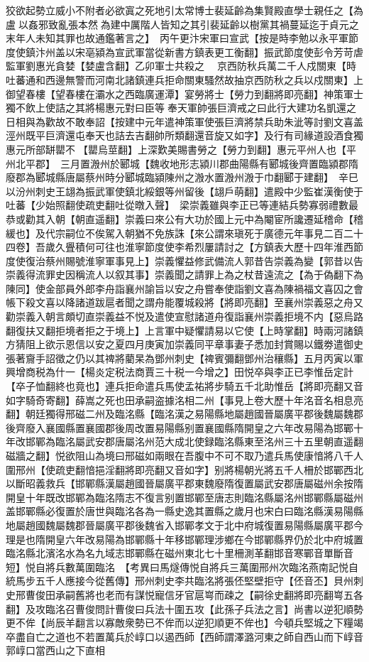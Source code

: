 狡欲起勢立威小不附者必欲寘之死地引太常博士裴延齡為集賢殿直學士親任之【為盧以姦邪致亂張本然為建中厲階人皆知之其引裴延齡以樹黨其禍蔓延迄于貞元之末年人未知其罪也故通鑑著言之】　丙午更汴宋軍曰宣武【按是時李勉以永平軍節度使鎮汴州盖以宋亳潁為宣武軍當從新書方鎮表更工衡翻】振武節度使彭令芳苛虐監軍劉惠光貪婪【婪盧含翻】乙卯軍士共殺之　京西防秋兵萬二千人戍關東【時吐蕃通和西邊無警而河南北諸鎮連兵拒命關東騷然故抽京西防秋之兵以戍關東】上御望春樓【望春樓在灞水之西臨廣運潭】宴勞將士【勞力到翻將即亮翻】神策軍士獨不飲上使詰之其將楊惠元對曰臣等奉天軍帥張巨濟戒之曰此行大建功名凱還之日相與為歡故不敢奉詔【按建中元年遣神策軍使張巨濟將禁兵助朱泚等討劉文喜盖涇州既平巨濟還屯奉天也詰去吉翻帥所類翻還音旋又如字】及行有司緣道設酒食獨惠元所部缾罌不【罌烏莖翻】上深歎美賜書勞之【勞力到翻】惠元平州人也【平州北平郡】　三月置溵州於郾城【魏收地形志潁川郡曲陽縣有郾城後齊置臨潁郡隋廢郡為郾城縣唐屬蔡州時分郾城臨潁陳州之溵水置溵州溵于巾翻郾于建翻】　辛巳以汾州刺史王翃為振武軍使鎮北綏銀等州留後【翃戶萌翻】遣殿中少監崔漢衡使于吐蕃【少始照翻使疏吏翻吐從暾入聲】　梁崇義雖與李正已等連結兵勢寡弱禮數最恭或勸其入朝【朝直遥翻】崇義曰來公有大功於國上元中為閹宦所讒遷延稽命【稽緩也】及代宗嗣位不俟駕入朝猶不免族誅【來公謂來瑱死于廣德元年事見二百二十四卷】吾歲久舋積何可往也淮寧節度使李希烈屢請討之【方鎮表大歷十四年淮西節度使復治蔡州賜號淮寧軍事見上】崇義懼益修武備流人郭昔告崇義為變【郭昔以告崇義得流罪史因稱流人以叙其事】崇義聞之請罪上為之杖昔遠流之【為于偽翻下為陳同】使金部員外郎李舟詣襄州諭旨以安之舟嘗奉使詣劉文喜為陳禍福文喜囚之會帳下殺文喜以降諸道跋扈者聞之謂舟能覆城殺將【將即亮翻】至襄州崇義惡之舟又勸崇義入朝言頗切直崇義益不悦及遣使宣慰諸道舟復詣襄州崇義拒境不内【惡烏路翻復扶又翻拒境者拒之于境上】上言軍中疑懼請易以它使【上時掌翻】時兩河諸鎮方猜阻上欲示恩信以安之夏四月庚寅加崇義同平章事妻子悉加封賞賜以鐵劵遣御史張著齎手詔徵之仍以其禆將藺杲為鄧州刺史【禆賓彌翻鄧州治穰縣】五月丙寅以軍興增商税為什一【楊炎定税法商賈三十税一今增之】田悦卒與李正已李惟岳定計【卒子恤翻終也竟也】連兵拒命遣兵馬使孟祐將步騎五千北助惟岳【將即亮翻又音如字騎奇寄翻】薛嵩之死也田承嗣盗據洺相二州【事見上卷大歷十年洺音名相息亮翻】朝廷獨得邢磁二州及臨洺縣【臨洺漢之易陽縣地屬趙國晉屬廣平郡後魏屬魏郡後齊廢入襄國縣置襄國郡後周改置易陽縣别置襄國縣隋開皇之六年改易陽為邯鄲十年改邯鄲為臨洺屬武安郡唐屬洺州范大成北使録臨洺縣東至洺州三十五里朝直遥翻磁牆之翻】悦欲阻山為境曰邢磁如兩眼在吾腹中不可不取乃遣兵馬使康愔將八千人圍邢州【使疏吏翻愔挹淫翻將即亮翻又音如字】别將楊朝光將五千人柵於邯鄲西北以斷昭義救兵【邯鄲縣漢屬趙國晉屬廣平郡東魏廢隋復置屬武安郡唐屬磁州余按隋開皇十年既改邯鄲為臨洺隋志不復言别置邯鄲至唐志則臨洺縣屬洺州邯鄲縣屬磁州盖邯鄲縣必復置於唐世與臨洺各為一縣史逸其置縣之歲月也宋白曰臨洺縣漢易陽縣地屬趙國魏屬魏郡晉屬廣平郡後魏省入邯鄲孝文于北中府城復置易陽縣屬廣平郡今理是也隋開皇六年改易陽為邯鄲縣十年移邯鄲理涉鄉在今邯鄲縣界仍於北中府城置臨洺縣北濱洺水為名九域志邯鄲縣在磁州東北七十里柵測革翻邯音寒鄲音單斷音短】悦自將兵數萬圍臨洺　【考異曰馬燧傳悦自將兵三萬圍邢州次臨洺燕南記悦自統馬步五千人應接今從舊傳】邢州刺史李共臨洺將張伾堅壁拒守【伾音丕】貝州刺史邢曹俊田承嗣舊將也老而有謀悦寵信牙官扈㟧而疎之【嗣徐史翻將即亮翻㟧五各翻】及攻臨洺召曹俊問計曹俊曰兵法十圍五攻【此孫子兵法之言】尚書以逆犯順勢更不侔【尚辰羊翻言以寡敵衆勢已不侔而以逆犯順更不侔也】今頓兵堅城之下糧竭卒盡自亡之道也不若置萬兵於崞口以遏西師【西師謂澤潞河東之師自西山而下崞音郭崞口當西山之下直相